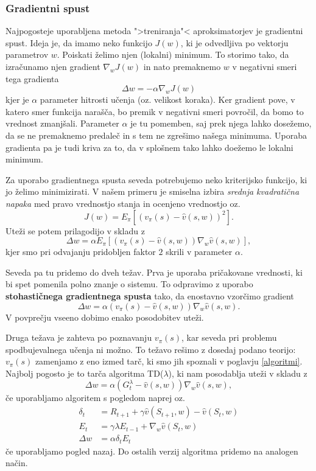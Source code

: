 \documentclass[12pt,a4paper]{amsart}
\theoremstyle{definition} %
\theoremstyle{plain} %
\begin{document}
\subsubsection{Gradientni spust}
Najpogosteje uporabljena metoda ">treniranja"< aproksimatorjev je gradientni spust. Ideja je, da 
imamo neko funkcijo $J(w)$, ki je odvedljiva po vektorju parametrov $w$. Poiskati želimo njen 
(lokalni) minimum. To storimo tako, da izračunamo njen gradient $\nabla_wJ(w)$ in nato premaknemo $w$
v negativni smeri tega gradienta
$$
\Delta w = - \alpha \nabla_wJ(w)
$$
kjer je $\alpha$ parameter hitrosti učenja (oz. velikost koraka). Ker gradient pove, v katero smer 
funkcija narašča, bo premik v negativni smeri povročil, da bomo to vrednost zmanjšali. Parameter 
$\alpha$ je tu pomemben, saj prek njega lahko dosežemo, da se ne premaknemo predaleč in s tem ne zgrešimo
našega minimuma. Uporaba gradienta pa je tudi kriva za to, da v splošnem tako lahko doežemo le lokalni 
minimum. 

Za uporabo gradientnega spusta seveda potrebujemo neko kriterijsko funkcijo, ki jo želimo minimizirati. 
V našem primeru je smiselna izbira \textit{srednja kvadratična napaka} med pravo vrednostjo stanja in 
ocenjeno vrednostjo oz. 
$$
J(w) = E_\pi [(v_\pi(s) - \hat{v}(s, w))^2].
$$
Uteži se potem prilagodijo v skladu z 
$$
\Delta w = \alpha E_\pi [(v_\pi(s) - \hat{v}(s, w)) \nabla_w \hat{v}(s, w)], 
$$
kjer smo pri odvajanju pridobljen faktor $2$ skrili v parameter $\alpha$.

Seveda pa tu pridemo do dveh težav. Prva je uporaba pričakovane vrednosti, ki bi spet pomenila polno 
znanje o sistemu. To odpravimo z uporabo \textbf{stohastičnega gradientnega spusta} tako, da 
enostavno vzorčimo gradient 
$$
\Delta w = \alpha (v_\pi(s) - \hat{v}(s, w)) \nabla_w \hat{v}(s, w). 
$$
V povprečju vseeno dobimo enako posodobitev uteži. 

Druga težava je zahteva po poznavanju $v_\pi(s)$, kar seveda pri problemu spodbujevalnega učenja ni 
možno. To težavo rešimo z dosedaj podano teorijo: $v_\pi(s)$ zamenjamo z eno izmed tarč, ki smo jih 
spoznali v poglavju \ref{algoritmi}. Najbolj pogosto je to tarča algoritma TD($\lambda$), ki nam 
posodablja uteži v skladu z 
$$
\Delta w = \alpha (G_t^\lambda - \hat{v}(s, w)) \nabla_w \hat{v}(s, w), 
$$
če uporabljamo algoritem s pogledom naprej oz. 
\begin{align*}
    \delta_t &= R_{t+1} + \gamma \hat{v}(S_{t+1}, w) - \hat{v}(S_t, w) \\
    E_t &= \gamma \lambda E_{t-1} + \nabla_w \hat{v}(S_t, w) \\
    \Delta w &= \alpha \delta_t E_t
\end{align*}
če uporabljamo pogled nazaj. Do ostalih verzij algoritma pridemo na analogen način.
\end{document}
